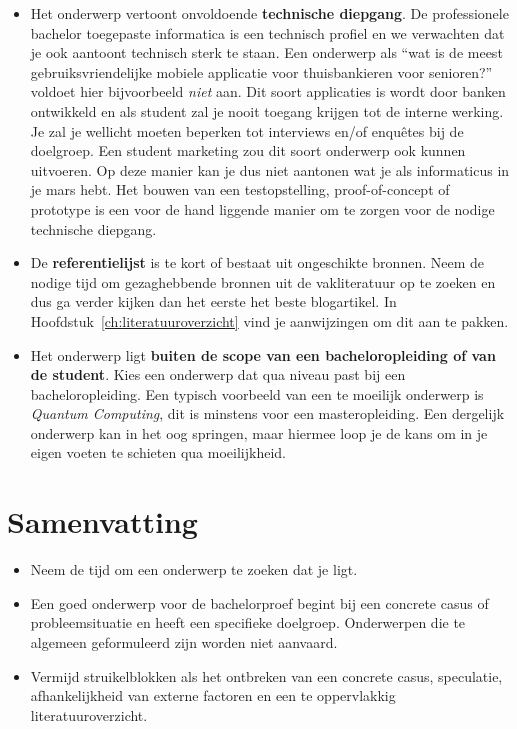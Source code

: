 \begin{itemize}
  \item Het onderwerp vertoont onvoldoende \textbf{technische diepgang}. De professionele bachelor toegepaste informatica is een technisch profiel en we verwachten dat je ook aantoont technisch sterk te staan. Een onderwerp als ``wat is de meest gebruiksvriendelijke mobiele applicatie voor thuisbankieren voor senioren?'' voldoet hier bijvoorbeeld \textit{niet} aan. Dit soort applicaties is wordt door banken ontwikkeld en als student zal je nooit toegang krijgen tot de interne werking. Je zal je wellicht moeten beperken tot interviews en/of enquêtes bij de doelgroep. Een student marketing zou dit soort onderwerp ook kunnen uitvoeren. Op deze manier kan je dus niet aantonen wat je als informaticus in je mars hebt. Het bouwen van een testopstelling, proof-of-concept of prototype is een voor de hand liggende manier om te zorgen voor de nodige technische diepgang.

  \item De \textbf{referentielijst} is te kort of bestaat uit ongeschikte bronnen. Neem de nodige tijd om gezaghebbende bronnen uit de vakliteratuur op te zoeken en dus ga verder kijken dan het eerste het beste blogartikel. In Hoofdstuk~\ref{ch:literatuuroverzicht} vind je aanwijzingen om dit aan te pakken.

  \item Het onderwerp ligt \textbf{buiten de scope van een bacheloropleiding of van de student}. Kies een onderwerp dat qua niveau past bij een bacheloropleiding. Een typisch voorbeeld van een te moeilijk onderwerp is \textit{Quantum Computing}, dit is minstens voor een masteropleiding. Een dergelijk onderwerp kan in het oog springen, maar hiermee loop je de kans om in je eigen voeten te schieten qua moeilijkheid.
\end{itemize}

\section{Samenvatting}%
\label{sec:onderwerp_samenvatting}

\begin{itemize}
  \item Neem de tijd om een onderwerp te zoeken dat je ligt.
  \item Een goed onderwerp voor de bachelorproef begint bij een concrete casus of probleemsituatie en heeft een specifieke doelgroep. Onderwerpen die te algemeen geformuleerd zijn worden niet aanvaard.
  \item Vermijd struikelblokken als het ontbreken van een concrete casus, speculatie, afhankelijkheid van externe factoren en een te oppervlakkig literatuuroverzicht.
\end{itemize}


